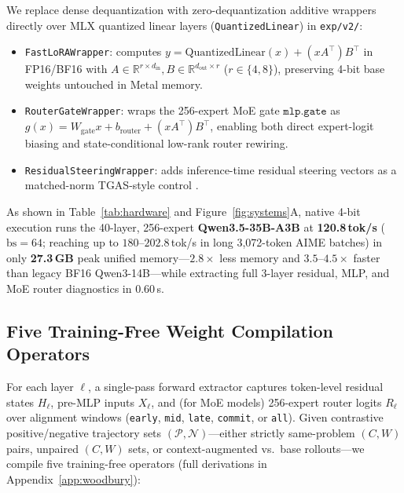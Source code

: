 \documentclass[10pt]{article}
\begin{document}
We replace dense dequantization with zero-dequantization additive wrappers directly over MLX quantized linear layers (\texttt{QuantizedLinear}) in \texttt{exp/v2/}:
\begin{itemize}[leftmargin=1.4em,itemsep=1pt,topsep=2pt]
    \item \texttt{FastLoRAWrapper}: computes $y = \mathrm{QuantizedLinear}(x) + (x A^\top) B^\top$ in FP16/BF16 with $A\in\mathbb{R}^{r\times d_{\mathrm{in}}}, B\in\mathbb{R}^{d_{\mathrm{out}}\times r}$ ($r \in \{4, 8\}$), preserving 4-bit base weights untouched in Metal memory.
    \item \texttt{RouterGateWrapper}: wraps the 256-expert MoE gate $\texttt{mlp.gate}$ as $g(x) = W_{\mathrm{gate}} x + b_{\mathrm{router}} + (x A^\top) B^\top$, enabling both direct expert-logit biasing and state-conditional low-rank router rewiring.
    \item \texttt{ResidualSteeringWrapper}: adds inference-time residual steering vectors as a matched-norm TGAS-style control \citep{nguyen2026stop}.
\end{itemize}
As shown in Table~\ref{tab:hardware} and Figure~\ref{fig:systems}A, native 4-bit execution runs the 40-layer, 256-expert \textbf{Qwen3.5-35B-A3B} at \textbf{120.8\,tok/s} ($\mathrm{bs}=64$; reaching up to $180\text{--}202.8$\,tok/s in long 3,072-token AIME batches) in only \textbf{27.3\,GB} peak unified memory---$2.8\times$ less memory and $3.5\text{--}4.5\times$ faster than legacy BF16 Qwen3-14B---while extracting full 3-layer residual, MLP, and MoE router diagnostics in $0.60$\,s.

\TableHardware

\subsection{Five Training-Free Weight Compilation Operators}
\label{sec:compilers}

For each layer $\ell$, a single-pass forward extractor captures token-level residual states $H_\ell$, pre-MLP inputs $X_\ell$, and (for MoE models) 256-expert router logits $R_\ell$ over alignment windows (\texttt{early}, \texttt{mid}, \texttt{late}, \texttt{commit}, or \texttt{all}). Given contrastive positive/negative trajectory sets $(\mathcal{P}, \mathcal{N})$---either strictly same-problem $(C, W)$ pairs, unpaired $(C, W)$ sets, or context-augmented vs.\ base rollouts---we compile five training-free operators (full derivations in Appendix~\ref{app:woodbury}):
\end{document}
